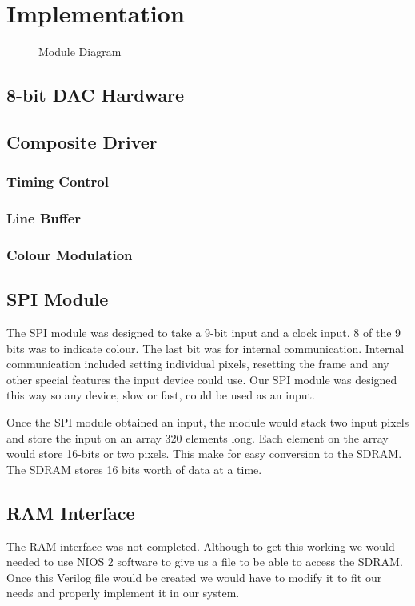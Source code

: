 \section{Implementation}

\begin{figure}[H]
    \centering
    \caption{Module Diagram}
\end{figure}

\subsection{8-bit DAC Hardware}


\subsection{Composite Driver}

\subsubsection{Timing Control}

\subsubsection{Line Buffer}

\subsubsection{Colour Modulation}

\subsection{SPI Module}

The SPI module was designed to take a 9-bit input and a clock input. 8 of the
9 bits was to indicate colour. The last bit was for internal communication. 
Internal communication included setting individual pixels, resetting the frame 
and any other special features the input device could use. Our SPI module was
designed this way so any device, slow or fast, could be used as an input.

Once the SPI module obtained an input, the module would stack two input pixels
and store the input on an array 320 elements long. Each element on the array 
would store 16-bits or two pixels. This make for easy conversion to the SDRAM.
The SDRAM stores 16 bits worth of data at a time.


\subsection{RAM Interface}

The RAM interface was not completed. Although to get this working we would 
needed to use NIOS 2 software to give us a file to be able to access the 
SDRAM. Once this Verilog file would be created we would have to modify it to
fit our needs and properly implement it in our system.


